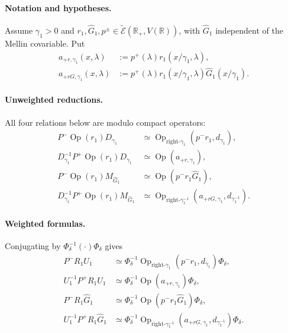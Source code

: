 \paragraph{Notation and hypotheses.}
Assume \(\gamma_1>0\) and
\(r_1,\widehat G_1,p^\pm
\in\widetilde{\mathcal E}(\mathbb R_+,V(\mathbb R))\), with
\(\widehat G_1\) independent of the Mellin covariable. Put
\[
\begin{aligned}
 a_{+r,\gamma_1}(x,\lambda)
 &:=p^+(\lambda)r_1(x/\gamma_1,\lambda),\\
 a_{+rG,\gamma_1}(x,\lambda)
 &:=p^+(\lambda)r_1(x/\gamma_1,\lambda)
    \widehat G_1(x/\gamma_1).
\end{aligned}
\]

\paragraph{Unweighted reductions.}
All four relations below are modulo compact operators:
\[
\begin{aligned}
 P^-\operatorname{Op}(r_1)D_{\gamma_1}
 &\simeq
 \operatorname{Op}_{\mathrm{right}\text{-}\gamma_1}
 (p^-r_1,d_{\gamma_1}),\\
 D_{\gamma_1}^{-1}P^+\operatorname{Op}(r_1)D_{\gamma_1}
 &\simeq \operatorname{Op}(a_{+r,\gamma_1}),\\
 P^-\operatorname{Op}(r_1)M_{\widehat G_1}
 &\simeq \operatorname{Op}(p^-r_1\widehat G_1),\\
 D_{\gamma_1}^{-1}P^+\operatorname{Op}(r_1)M_{\widehat G_1}
 &\simeq
 \operatorname{Op}_{\mathrm{right}\text{-}\gamma_1^{-1}}
 (a_{+rG,\gamma_1},d_{\gamma_1^{-1}}).
\end{aligned}
\]

\paragraph{Weighted formulas.}
Conjugating by \(\Phi_\delta^{-1}(\cdot)\Phi_\delta\) gives
\[
\begin{aligned}
 P^-R_1U_1
 &\simeq\Phi_\delta^{-1}
 \operatorname{Op}_{\mathrm{right}\text{-}\gamma_1}
 (p^-r_1,d_{\gamma_1})\Phi_\delta,\\
 U_1^{-1}P^+R_1U_1
 &\simeq\Phi_\delta^{-1}
 \operatorname{Op}(a_{+r,\gamma_1})\Phi_\delta,\\
 P^-R_1\widehat G_1
 &\simeq\Phi_\delta^{-1}
 \operatorname{Op}(p^-r_1\widehat G_1)\Phi_\delta,\\
 U_1^{-1}P^+R_1\widehat G_1
 &\simeq\Phi_\delta^{-1}
 \operatorname{Op}_{\mathrm{right}\text{-}\gamma_1^{-1}}
 (a_{+rG,\gamma_1},d_{\gamma_1^{-1}})\Phi_\delta.
\end{aligned}
\]

